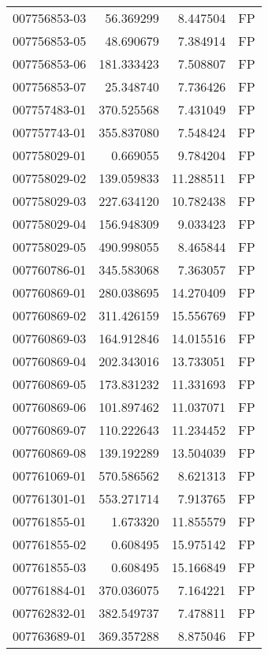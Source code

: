 \begin{tabular}{lrrl}
007756853-03 &   56.369299 &       8.447504 &   FP \\
007756853-05 &   48.690679 &       7.384914 &   FP \\
007756853-06 &  181.333423 &       7.508807 &   FP \\
007756853-07 &   25.348740 &       7.736426 &   FP \\
007757483-01 &  370.525568 &       7.431049 &   FP \\
007757743-01 &  355.837080 &       7.548424 &   FP \\
007758029-01 &    0.669055 &       9.784204 &   FP \\
007758029-02 &  139.059833 &      11.288511 &   FP \\
007758029-03 &  227.634120 &      10.782438 &   FP \\
007758029-04 &  156.948309 &       9.033423 &   FP \\
007758029-05 &  490.998055 &       8.465844 &   FP \\
007760786-01 &  345.583068 &       7.363057 &   FP \\
007760869-01 &  280.038695 &      14.270409 &   FP \\
007760869-02 &  311.426159 &      15.556769 &   FP \\
007760869-03 &  164.912846 &      14.015516 &   FP \\
007760869-04 &  202.343016 &      13.733051 &   FP \\
007760869-05 &  173.831232 &      11.331693 &   FP \\
007760869-06 &  101.897462 &      11.037071 &   FP \\
007760869-07 &  110.222643 &      11.234452 &   FP \\
007760869-08 &  139.192289 &      13.504039 &   FP \\
007761069-01 &  570.586562 &       8.621313 &   FP \\
007761301-01 &  553.271714 &       7.913765 &   FP \\
007761855-01 &    1.673320 &      11.855579 &   FP \\
007761855-02 &    0.608495 &      15.975142 &   FP \\
007761855-03 &    0.608495 &      15.166849 &   FP \\
007761884-01 &  370.036075 &       7.164221 &   FP \\
007762832-01 &  382.549737 &       7.478811 &   FP \\
007763689-01 &  369.357288 &       8.875046 &   FP \\

\end{tabular}
